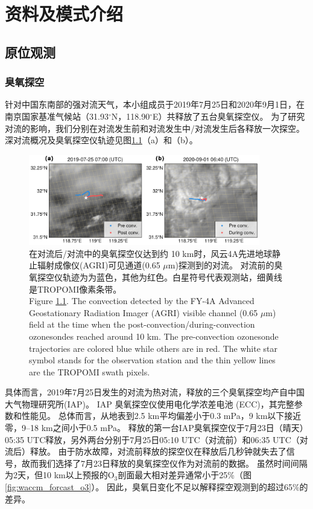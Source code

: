 
\chapter{资料及模式介绍}

\section{原位观测}

\subsection{臭氧探空}

针对中国东南部的强对流天气，本小组成员于2019年7月25日和2020年9月1日，在南京国家基准气候站（31.93$^{\circ}$N，118.90$^{\circ}$E）共释放了五台臭氧探空仪。
为了研究对流的影响，我们分别在对流发生前和对流发生中/对流发生后各释放一次探空。
深对流概况及臭氧探空仪轨迹见图\ref{fig:ozonesonde}（a）和（b）。

\begin{figure}[!htbp]
\centering
\includegraphics[width=0.9\textwidth]{./figures/ozonesonde.png}
\caption{在对流后/对流中的臭氧探空仪达到约 10 km时，风云4A先进地球静止辐射成像仪(AGRI)可见通道(0.65 $\mu$m)探测到的对流。
对流前的臭氧探空仪轨迹为为蓝色，其他为红色。白星符号代表观测站，细黄线是TROPOMI像素条带。\\
Figure \ref{fig:ozonesonde}. The convection detected by the FY-4A Advanced Geostationary Radiation Imager (AGRI)
visible channel (0.65 $\mu$m) field at the time when the post-convection/during-convection ozonesondes reached around 10 km.
The pre-convection ozonesonde trajectories are colored blue while others are in red.
The white star symbol stands for the observation station and the thin yellow lines are the TROPOMI swath pixels.
}
\label{fig:ozonesonde}
\end{figure}


具体而言，2019年7月25日发生的对流为热对流，释放的三个臭氧探空均产自中国大气物理研究所(IAP)。
IAP 臭氧探空仪使用电化学浓差电池 (ECC)，其完整参数和性能见\citet{Zhang.2014}。
总体而言，从地表到2.5 km平均偏差小于0.3 mPa，9 km以下接近零，9--18 km之间小于0.5 mPa。
释放的第一台IAP臭氧探空仪于7月23日（晴天）05:35 UTC释放，另外两台分别于7月25日05:10 UTC（对流前）和06:35 UTC（对流后）释放。
由于防水故障，对流前释放的探空仪在释放后几秒钟就失去了信号，故而我们选择了7月23日释放的臭氧探空仪作为对流前的数据。
虽然时间间隔为2天，但10 km以上预报的O$_3$剖面最大相对差异通常小于25\%（图\ref{fig:waccm_forcast_o3}）。
因此，臭氧日变化不足以解释探空观测到的超过65\%的差异。

